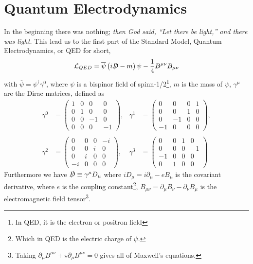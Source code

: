\documentclass[12pt, a4paper]{book}
\begin{document}
\section{Quantum Electrodynamics}
In the beginning there was nothing; \textit{then God said, “Let there be light,” and there was light.} This lead us to the first part of the Standard Model, Quantum Electrodynamics, or QED for short,
\begin{equation}\label{eq:QED}
    \mathcal{L}_{QED} = \overline{\psi}\left(i\slashed{D} -m\right)\psi -\frac{1}{4}B^{\mu\nu}B_{\mu\nu}
\end{equation}
with $\overline{\psi}=\psi^\dagger\gamma^0$, where $\psi$ is a bispinor field of spinn-1/2\footnote{In QED, it is the electron or positron field}, $m$ is the mass of $\psi$, $\gamma^\mu$ are the Dirac matrices, defined as 
$$
\begin{aligned}
    \gamma ^{0}&={\begin{pmatrix}1&0&0&0\\0&1&0&0\\0&0&-1&0\\0&0&0&-1\end{pmatrix}},&\gamma ^{1}&={\begin{pmatrix}0&0&0&1\\0&0&1&0\\0&-1&0&0\\-1&0&0&0\end{pmatrix}},\\\\
    \gamma ^{2}&={\begin{pmatrix}0&0&0&-i\\0&0&i&0\\0&i&0&0\\-i&0&0&0\end{pmatrix}},&\gamma ^{3}&={\begin{pmatrix}0&0&1&0\\0&0&0&-1\\-1&0&0&0\\0&1&0&0\end{pmatrix}}~
\end{aligned}
$$
Furthermore we have $\slashed{D}\equiv \gamma^\mu D_\mu$ where $iD_\mu = i\partial_\mu -eB_\mu$ is the covariant derivative, where $e$ is the coupling constant\footnote{Which in QED is the electric charge of $\psi$.},
$B_{\mu\nu}=\partial_\mu B_\nu - \partial_\nu B_\mu$ is the electromagnetic field tensor\footnote{Taking $\partial_\mu B^{\mu\nu} + \star \partial_\mu B^{\mu\nu} = 0$ gives all of Maxwell's equations.}. 
\end{document}
